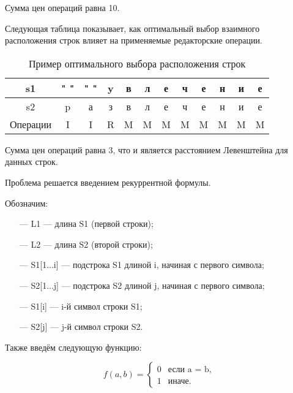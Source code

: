 Сумма цен операций равна 10.

Следующая таблица показывает, как оптимальный выбор взаимного расположения строк влияет на применяемые редакторские операции.

\begin{table}[h]
	\begin{center}
		\caption{\label{tabular:ex2} Пример оптимального выбора расположения строк}
			\begin{tabular}{c|c|c|c|c|c|c|c|c|c|c|c}
				s1 & " " & " " & y & в & л & е & ч & е & н & и & е \\
				\hline
				s2 & p & а & з & в & л & е & ч & е & н & и & е \\
				\hline
				Операции & I & I & R & M & M & M & M & M & M & M & M
			\end{tabular}
	\end{center}
\end{table}

Сумма цен операций равна 3, что и является расстоянием Левенштейна для данных строк.

Проблема решается введением рекуррентной формулы.

Обозначим:
\begin{itemize}
	\item[---] L1 --- длина S1 (первой строки);
	\item[---] L2 --- длина S2 (второй строки);
	\item[---] S1[1...i] --- подстрока S1 длиной i, начиная с первого символа;
	\item[---] S2[1...j] --- подстрока S2 длиной j, начиная с первого символа;
	\item[---] S1[i] --- i-й символ строки S1;
	\item[---] S2[j] --- j-й символ строки S2.
\end{itemize}

Также введём следующую функцию:

\begin{equation}
	\label{eq:m}
	f(a, b) = \begin{cases}
		0 &\text{если a = b,}\\
		1 &\text{иначе}.
	\end{cases}
\end{equation}

